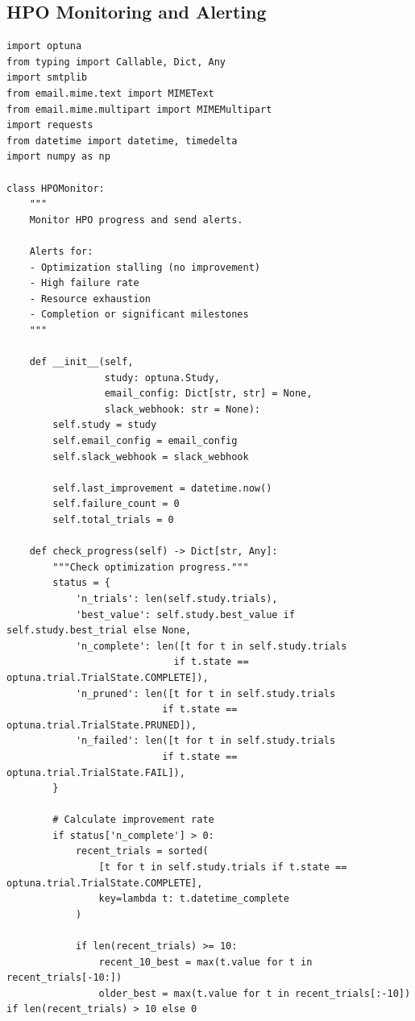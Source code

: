 \subsection{HPO Monitoring and Alerting}

\begin{lstlisting}[style=python, caption=Monitoring and alerting for production HPO]
import optuna
from typing import Callable, Dict, Any
import smtplib
from email.mime.text import MIMEText
from email.mime.multipart import MIMEMultipart
import requests
from datetime import datetime, timedelta
import numpy as np

class HPOMonitor:
    """
    Monitor HPO progress and send alerts.

    Alerts for:
    - Optimization stalling (no improvement)
    - High failure rate
    - Resource exhaustion
    - Completion or significant milestones
    """

    def __init__(self,
                 study: optuna.Study,
                 email_config: Dict[str, str] = None,
                 slack_webhook: str = None):
        self.study = study
        self.email_config = email_config
        self.slack_webhook = slack_webhook

        self.last_improvement = datetime.now()
        self.failure_count = 0
        self.total_trials = 0

    def check_progress(self) -> Dict[str, Any]:
        """Check optimization progress."""
        status = {
            'n_trials': len(self.study.trials),
            'best_value': self.study.best_value if self.study.best_trial else None,
            'n_complete': len([t for t in self.study.trials
                             if t.state == optuna.trial.TrialState.COMPLETE]),
            'n_pruned': len([t for t in self.study.trials
                           if t.state == optuna.trial.TrialState.PRUNED]),
            'n_failed': len([t for t in self.study.trials
                           if t.state == optuna.trial.TrialState.FAIL]),
        }

        # Calculate improvement rate
        if status['n_complete'] > 0:
            recent_trials = sorted(
                [t for t in self.study.trials if t.state == optuna.trial.TrialState.COMPLETE],
                key=lambda t: t.datetime_complete
            )

            if len(recent_trials) >= 10:
                recent_10_best = max(t.value for t in recent_trials[-10:])
                older_best = max(t.value for t in recent_trials[:-10]) if len(recent_trials) > 10 else 0


\end{lstlisting}
